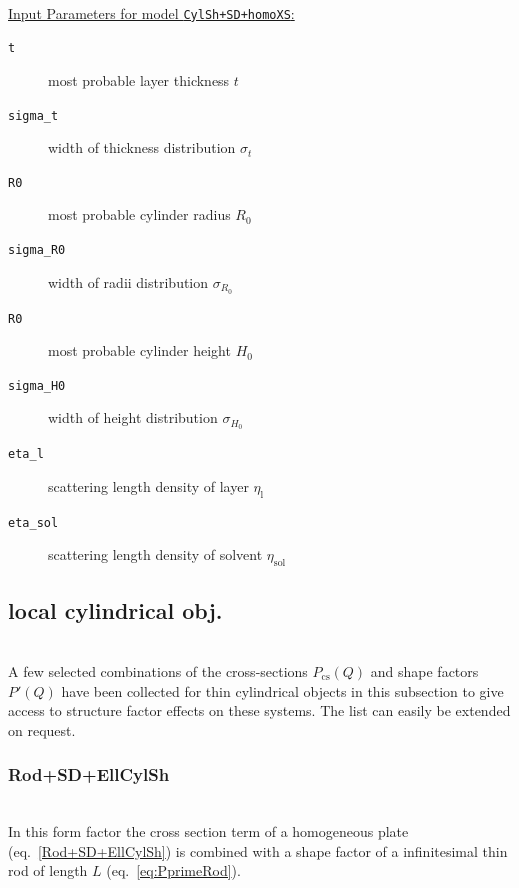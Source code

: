 \hspace{1pt}\\
\uline{Input Parameters for model \texttt{CylSh+SD+homoXS}:}\\
\begin{description}
\item[\texttt{t}] most probable layer thickness $t$
\item[\texttt{sigma\_t}] width of thickness distribution $\sigma_t$
\item[\texttt{R0}] most probable cylinder radius $R_0$
\item[\texttt{sigma\_R0}] width of radii distribution $\sigma_{R_0}$
\item[\texttt{R0}] most probable cylinder height $H_0$
\item[\texttt{sigma\_H0}] width of height distribution $\sigma_{H_0}$
\item[\texttt{eta\_l}] scattering length density of layer $\eta_\mathrm{l}$
\item[\texttt{eta\_sol}] scattering length density of solvent $\eta_\mathrm{sol}$
\end{description}

\clearpage
\subsection{local cylindrical obj.} ~\\
\label{plugin:LocalCylindrical)}
A few selected combinations of the cross-sections $P_\mathrm{cs}(Q)$ and shape factors $P'(Q)$ have
been collected for thin cylindrical objects in this subsection to give access to structure factor
effects on these systems. The list can easily be extended on request.

\vspace{5mm}

\noindent
\subsubsection{Rod+SD+EllCylSh} ~\\

\noindent
In this form factor the cross section term of a homogeneous plate (eq.\ \ref{Rod+SD+EllCylSh}) is combined with a shape factor of a infinitesimal thin rod of length $L$ (eq.\ \ref{eq:PprimeRod}).

\vspace{5mm}

